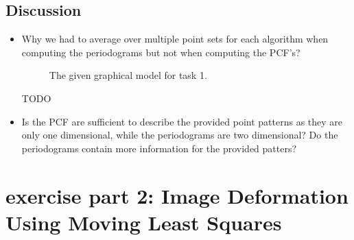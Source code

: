 \documentclass[paper=a4, fontsize=11pt]{scrartcl} %
\numberwithin{equation}{section} %
\numberwithin{figure}{section} %
\numberwithin{table}{section} %
\begin{document}
\subsection{Discussion}

\begin{itemize}
	\item Why we had to average over multiple point sets for each algorithm when computing the periodograms but not when computing the PCF's?
	
	\begin{figure}[H]
	\caption{The given graphical model for task 1.\label{fig:simple}}
	\noindent{}
	\end{figure}
	
	TODO
	
	\item Is the PCF are sufficient to describe the provided point patterns as they are only one dimensional, while the periodograms are two dimensional? Do the periodograms contain more information for the provided patters?
\end{itemize}


\section{exercise part 2: Image Deformation Using Moving Least Squares}
\end{document}
